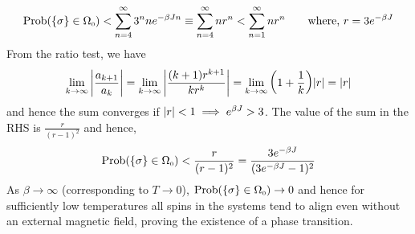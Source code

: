 $$\mathrm{Prob}(\{\sigma\} \in \Omega_{\text{\tiny 0}}) <\sum\limits_{n=4}^\infty  3^n ne^{-\beta J n} \equiv\sum\limits_{n=4}^\infty  n r^n <\sum\limits_{n=1}^\infty  n r^n \qquad \text{where, }r =3e^{-\beta J }$$
From the ratio test, we have 
$$\lim\limits_{k\to \infty}\abs{\frac{a_{k+1}}{a_k}} = \lim\limits_{k\to \infty}\abs{\frac{(k+1)r^{k+1}}{kr^k}} =\lim\limits_{k\to \infty}\qty(1+\frac{1}{k})\abs{r} = \abs{r}$$
and hence the sum converges if $\abs{r}<1\implies e^{\beta J}>3$. The value of the sum in the RHS is $\frac{r}{(r-1)^2}$ and hence,
$$\mathrm{Prob}(\{\sigma\} \in \Omega_{\text{\tiny 0}}) < \frac{r}{(r-1)^2} = \frac{3e^{-\beta J }}{(3e^{-\beta J }-1)^2}$$
As $\beta\to \infty$ (corresponding to $T\to 0$), $\mathrm{Prob}(\{\sigma\} \in \Omega_{\text{\tiny 0}}) \to 0$ and hence for sufficiently low temperatures all spins in the systems tend to align even without an external magnetic field, proving the existence of a phase transition. 

